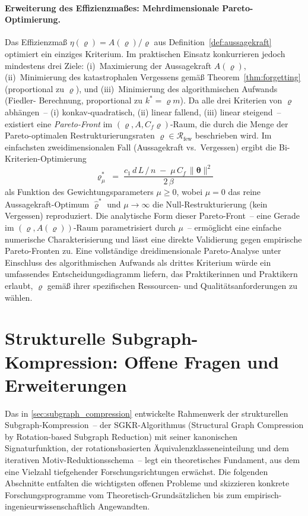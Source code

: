 \documentclass[12pt, a4paper, openany]{report}
\newcommand{\calR}{\mathcal{R}}
\begin{document}
\paragraph{Erweiterung des Effizienzmaßes: Mehrdimensionale
Pareto-Optimierung.}
Das Effizienzmaß $\eta(\varrho) = A(\varrho)/\varrho$ aus
Definition~\ref{def:aussagekraft} optimiert ein einziges Kriterium.  Im
praktischen Einsatz konkurrieren jedoch mindestens drei Ziele:
(i)~Maximierung der Aussagekraft $A(\varrho)$, (ii)~Minimierung des
katastrophalen Vergessens gemäß Theorem~\ref{thm:forgetting} (proportional
zu $\varrho$), und (iii)~Minimierung des algorithmischen Aufwands (Fiedler-
Berechnung, proportional zu $k^* = \varrho m$).  Da alle drei Kriterien
von $\varrho$ abhängen~-- (i) konkav-quadratisch, (ii) linear fallend,
(iii) linear steigend~-- existiert eine \emph{Pareto-Front} im
$(\varrho, A, C_f\varrho)$-Raum, die durch die Menge der Pareto-optimalen
Restrukturierungsraten $\varrho \in \calR_{\mathrm{few}}$ beschrieben wird.
Im einfachsten zweidimensionalen Fall (Aussagekraft vs.\ Vergessen) ergibt
die Bi-Kriterien-Optimierung
\[
  \varrho^*_{\mu}
  \;=\; \frac{c_1\,d\,L\,/\,n \;-\; \mu\,C_f\,\|\bm\theta\|^2}{2\,\beta}
\]
als Funktion des Gewichtungsparameters $\mu \geq 0$, wobei $\mu = 0$ das
reine Aussagekraft-Optimum $\hat\varrho^*$ und $\mu \to \infty$ die
Null-Restrukturierung (kein Vergessen) reproduziert.  Die analytische Form
dieser Pareto-Front~-- eine Gerade im $(\varrho, A(\varrho))$-Raum
parametrisiert durch $\mu$~-- ermöglicht eine einfache numerische
Charakterisierung und lässt eine direkte Validierung gegen empirische
Pareto-Fronten zu.  Eine vollständige dreidimensionale Pareto-Analyse unter
Einschluss des algorithmischen Aufwands als drittes Kriterium würde ein
umfassendes Entscheidungsdiagramm liefern, das Praktikerinnen und Praktikern
erlaubt, $\varrho$ gemäß ihrer spezifischen Ressourcen- und
Qualitätsanforderungen zu wählen.

\section{Strukturelle Subgraph-Kompression: Offene Fragen und Erweiterungen}
\label{sec:outlook_subgraph}

Das in \cref{sec:subgraph_compression} entwickelte Rahmenwerk der strukturellen
Subgraph-Kom\-pression~-- der SGKR-Algorithmus (Structural Graph Compression by
Rotation-based Subgraph Reduction) mit seiner kanonischen Signaturfunktion,
der rotationsbasierten Äquivalenzklasseneinteilung und dem iterativen
Motiv-Reduktionsschema~-- legt ein theoretisches Fundament, aus dem eine
Vielzahl tiefgehender Forschungsrichtungen erwächst.  Die folgenden Abschnitte
entfalten die wichtigsten offenen Probleme und skizzieren konkrete
Forschungsprogramme vom Theoretisch-Grundsätzlichen bis zum
empirisch-ingenieurwissenschaftlich Angewandten.
\end{document}
